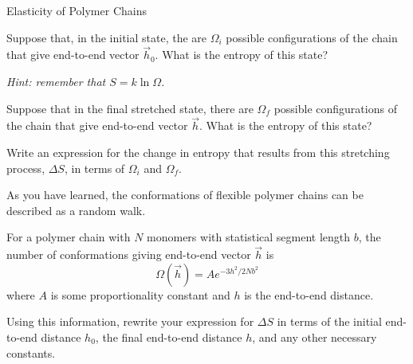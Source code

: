 \begin{activity}{Elasticity of Polymer Chains}
\begin{ctqs}
	\question Suppose that, in the initial state, the are $\Omega_i$ possible configurations of the chain that give end-to-end vector $\vec h_0$.  What is the entropy of this state?
	
		\emph{Hint: remember that $S = k\ln\Omega$.}
		
		\begin{solution}[0.5in]
		\end{solution}
	
	\question Suppose that in the final stretched state, there are $\Omega_f$ possible configurations of the chain that give end-to-end vector $\vec h$.  What is the entropy of this state?
		
		\begin{solution}[0.5in]
		\end{solution}
	
	\question Write an expression for the change in entropy that results from this stretching process, $\Delta S$, in terms of $\Omega_i$ and $\Omega_f$.
		
		\begin{solution}[1in]
		\end{solution}
	
\end{ctqs}

\begin{infobox}

	As you have learned, the conformations of flexible polymer chains can be described as a random walk.
	
	For a polymer chain with $N$ monomers with statistical segment length $b$, the number of conformations giving end-to-end vector $\vec h$ is
	\begin{equation*}
		\Omega(\vec h) = A e^{-3h^2/2Nb^2}
	\end{equation*}
	where $A$ is some proportionality constant and $h$ is the end-to-end distance.
	
\end{infobox}

\begin{ctqs}
	
	\question Using this information, rewrite your expression for $\Delta S$ in terms of the initial end-to-end distance $h_0$, the final end-to-end distance $h$, and any other necessary constants.
	
		\label{\labelbase:forcechain}
		
		\begin{solution}[2in]
		\end{solution}
	

\end{ctqs}
\end{activity}
